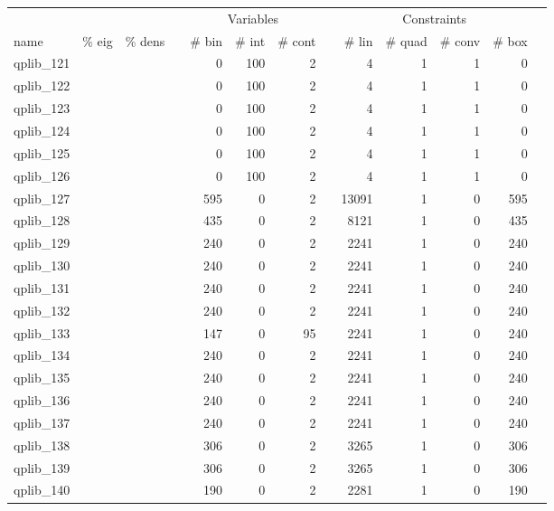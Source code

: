 \begin{table}
 \centering
 \setlength{\tabcolsep}{7pt}
 \renewcommand \arraystretch{1}
\begin{tabular}{lrrrrrrrrrrrr}
\toprule

		&		&		&	&	\multicolumn{3}{c}{Variables}					&	&	\multicolumn{4}{c}{Constraints}							\\
\cmidrule(lr){5-7} \cmidrule(lr){9-12}							 														
name	&	\% eig	&	\% dens	&	&	\# bin	&	\# int 	&	\# cont 	&	&	\# lin 	&	\# quad 	&	\# conv 	&	\# box	\\
\cmidrule(lr){5-7} \cmidrule(lr){9-12}																					



qplib\_121	&		&		&	&	0	&	100	&	2	&	&	4	&	1	&	1	&	0	\\
qplib\_122	&		&		&	&	0	&	100	&	2	&	&	4	&	1	&	1	&	0	\\
qplib\_123	&		&		&	&	0	&	100	&	2	&	&	4	&	1	&	1	&	0	\\
qplib\_124	&		&		&	&	0	&	100	&	2	&	&	4	&	1	&	1	&	0	\\
qplib\_125	&		&		&	&	0	&	100	&	2	&	&	4	&	1	&	1	&	0	\\
qplib\_126	&		&		&	&	0	&	100	&	2	&	&	4	&	1	&	1	&	0	\\
qplib\_127	&		&		&	&	595	&	0	&	2	&	&	13091	&	1	&	0	&	595	\\
qplib\_128	&		&		&	&	435	&	0	&	2	&	&	8121	&	1	&	0	&	435	\\
qplib\_129	&		&		&	&	240	&	0	&	2	&	&	2241	&	1	&	0	&	240	\\
qplib\_130	&		&		&	&	240	&	0	&	2	&	&	2241	&	1	&	0	&	240	\\
qplib\_131	&		&		&	&	240	&	0	&	2	&	&	2241	&	1	&	0	&	240	\\
qplib\_132	&		&		&	&	240	&	0	&	2	&	&	2241	&	1	&	0	&	240	\\
qplib\_133	&		&		&	&	147	&	0	&	95	&	&	2241	&	1	&	0	&	240	\\
qplib\_134	&		&		&	&	240	&	0	&	2	&	&	2241	&	1	&	0	&	240	\\
qplib\_135	&		&		&	&	240	&	0	&	2	&	&	2241	&	1	&	0	&	240	\\
qplib\_136	&		&		&	&	240	&	0	&	2	&	&	2241	&	1	&	0	&	240	\\
qplib\_137	&		&		&	&	240	&	0	&	2	&	&	2241	&	1	&	0	&	240	\\
qplib\_138	&		&		&	&	306	&	0	&	2	&	&	3265	&	1	&	0	&	306	\\
qplib\_139	&		&		&	&	306	&	0	&	2	&	&	3265	&	1	&	0	&	306	\\
qplib\_140	&		&		&	&	190	&	0	&	2	&	&	2281	&	1	&	0	&	190	\\

\end{tabular}
\end{table}

